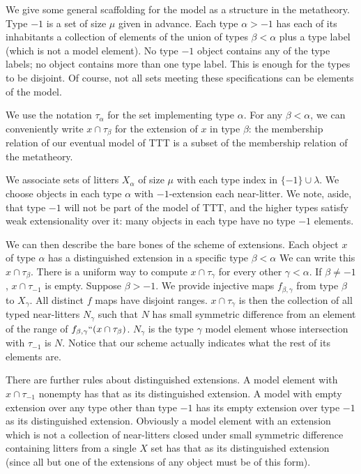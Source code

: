 \documentclass{slides}
\begin{document}
\begin{slide}

We give some general scaffolding for the model as a structure in the metatheory.  Type $-1$ is a set of size $\mu$ given in advance.  Each type $\alpha>-1$ has each of its inhabitants a collection of elements  of the union of types $\beta <\alpha$ plus a type label (which is not a model element).  No type $-1$ object contains any of the type labels;  no object contains more than one type label. This is enough for the types to be disjoint.   Of course, not all sets meeting these specifications can be elements of the model.

We use the notation $\tau_\alpha$ for the set implementing type $\alpha$.  For any $\beta<\alpha$, we can conveniently write $x \cap \tau_\beta$ for the extension of $x$ in type $\beta$:  the membership relation of our eventual model of TTT is a subset of the membership relation of the metatheory.

\end{slide}

\begin{slide}

We associate sets of litters $X_\alpha$ of size $\mu$ with each type index in $\{-1\} \cup \lambda$.  We choose objects in each type $\alpha$ with $-1$-extension each near-litter.  We note, aside, that type $-1$ will not be part  of the model of TTT, and the higher types satisfy weak extensionality over it:  many objects in each type have no type $-1$ elements.

We can then describe the bare bones of the scheme of extensions.  Each object $x$ of type $\alpha$ has a distinguished extension in a specific type $\beta<\alpha$  We can write this $x \cap \tau_\beta$.  There is a uniform way to compute $x \cap \tau_\gamma$ for every other $\gamma<\alpha$.  If $\beta\neq -1$, $x \cap \tau_{-1}$ is empty.  Suppose $\beta>-1$.  We provide injective maps $f_{\beta,\gamma}$ from type $\beta$ to $X_\gamma$.  All distinct $f$ maps have disjoint ranges.  $x \cap \tau_\gamma$ is then the collection of all  typed near-litters $N_\gamma$ such that $N$ has small symmetric difference from an element of the range of $f_{\beta,\gamma}``(x \cap \tau_\beta)$.  $N_\gamma$ is the type $\gamma$ model element whose intersection with $\tau_{-1}$ is $N$.  Notice that our scheme actually indicates what the rest of its elements are.

\end{slide}

\begin{slide}

There are further rules about distinguished extensions.  A model element with $x \cap \tau_{-1}$ nonempty has that as its distinguished extension.  A model with empty extension over any type other than type $-1$ has its empty extension over type $-1$ as its distinguished extension.  Obviously a model element with an extension which is not a collection of near-litters closed under small symmetric difference containing litters from a single $X$ set has that as its distinguished extension (since all but one of the extensions of any object must be of this form).  

\end{slide}
\end{document}

